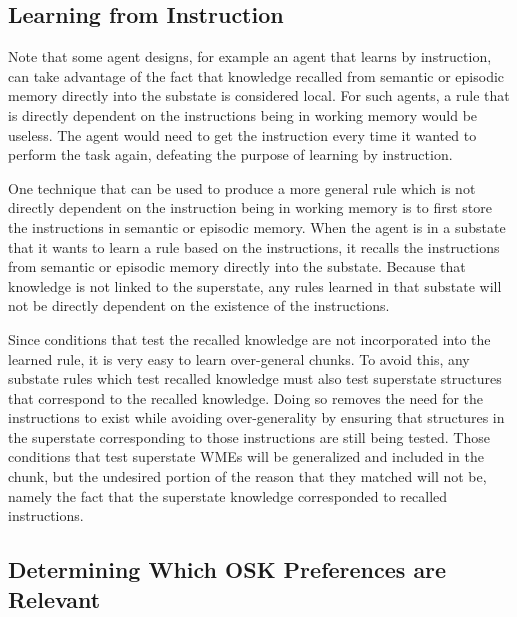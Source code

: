 \subsection{Learning from Instruction}

	Note that some agent designs, for example an agent that learns by instruction, can take advantage of the fact that knowledge recalled from semantic or episodic memory directly into the substate is considered local.   For such agents, a rule that is directly dependent on the instructions being in working memory would be useless.  The agent would need to get the instruction every time it wanted to perform the task again, defeating the purpose of learning by instruction.  
	
	One technique that can be used to produce a more general rule which is not directly dependent on the instruction being in working memory is to first store the instructions in semantic or episodic memory.  When the agent is in a substate that it wants to learn a rule based on the instructions, it recalls the instructions from semantic or episodic memory directly into the substate.  Because that knowledge is not linked to the superstate, any rules learned in that substate will not be directly dependent on the existence of the instructions.  
	
	Since conditions that test the recalled knowledge are not incorporated into the learned rule, it is very easy to learn over-general chunks.  To avoid this, any substate rules which test recalled knowledge must also test superstate structures that correspond to the recalled knowledge.  Doing so removes the need for the instructions to exist while avoiding over-generality by ensuring that structures in the superstate corresponding to those instructions are still being tested.  Those conditions that test superstate WMEs will be generalized and included in the chunk, but the undesired portion of the reason that they matched will not be, namely the fact that the superstate knowledge corresponded to recalled instructions.

\subsection{Determining Which OSK Preferences are Relevant}
\label{CHUNKING-subtleties-osk}

